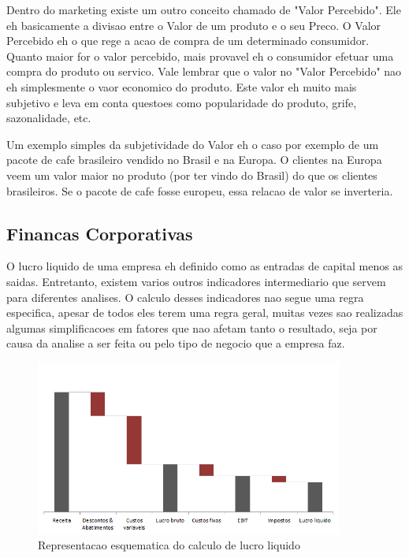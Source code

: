 \documentclass[12pt]{article}
\begin{document}
Dentro do marketing existe um outro conceito chamado de "Valor Percebido". Ele eh basicamente a divisao entre o Valor de um produto e o seu Preco. O Valor Percebido eh o que rege a acao de compra de um determinado consumidor. Quanto maior for o valor percebido, mais provavel eh o consumidor efetuar uma compra do produto ou servico. Vale lembrar que o valor no "Valor Percebido" nao eh simplesmente o vaor economico do produto. Este valor eh muito mais subjetivo e leva em conta questoes como popularidade do produto, grife, sazonalidade, etc.

Um exemplo simples da subjetividade do Valor eh o caso por exemplo de um pacote de cafe brasileiro vendido no Brasil e na Europa. O clientes na Europa veem um valor maior no produto (por ter vindo do Brasil) do que os clientes brasileiros. Se o pacote de cafe fosse europeu, essa relacao de valor se inverteria.

\subsection{Financas Corporativas}
O lucro liquido de uma empresa eh definido como as entradas de capital menos as saidas. Entretanto, existem varios outros indicadores intermediario que servem para diferentes analises. O calculo desses indicadores nao segue uma regra especifica, apesar de todos eles terem uma regra geral, muitas vezes sao realizadas algumas simplificacoes em fatores que nao afetam tanto o resultado, seja por causa da analise a ser feita ou pelo tipo de negocio que a empresa faz.

\begin{figure}[h!]
	\centering
	\includegraphics[width=0.9\textwidth]{img/finance.png}
	\caption{Representacao esquematica do calculo de lucro liquido}
	\label{fig:lucro}
\end{figure}
\end{document}
